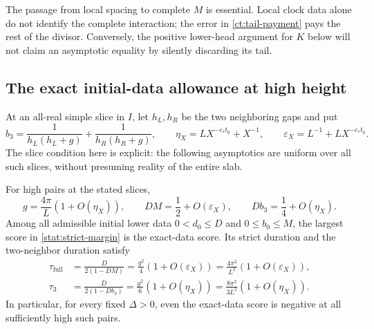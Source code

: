 The passage from local spacing to complete $M$ is essential. Local
clock data alone do not identify the complete interaction; the error
in \eqref{ct:tail-payment} pays the rest of the divisor. Conversely,
the positive lower-head argument for $K$ below will not claim an
asymptotic equality by silently discarding its tail.

\subsection{The exact initial-data allowance at high height}

At an all-real simple slice in $I$, let $h_L,h_R$ be the two neighboring
gaps and put
\[
 b_3=\frac1{h_L(h_L+g)}+\frac1{h_R(h_R+g)},\qquad
 \eta_X=LX^{-c_*t_0}+X^{-1},\qquad
 \varepsilon_X=L^{-1}+LX^{-c_*t_0}.
\]
The slice condition here is explicit: the following asymptotics are
uniform over all such slices, without presuming reality of the entire
slab.

\begin{theorem}
\label{ct:initial-horizon}
For high pairs at the stated slices,
\begin{equation}
 g=\frac{4\pi}{L}(1+O(\eta_X)),\qquad
 DM=\frac12+O(\varepsilon_X),\qquad
 Db_3=\frac14+O(\eta_X).
 \label{ct:initial-asymptotics}
\end{equation}
Among all admissible initial lower data
$0<d_0\le D$ and $0\le b_0\le M$, the largest score in
\eqref{stat:strict-margin} is the exact-data score. Its strict duration
and the two-neighbor duration satisfy
\begin{equation}
 \begin{split}
 \tau_{\mathrm{full}}
 &=\frac{D}{2(1-DM)}
   =\frac{g^2}{4}(1+O(\varepsilon_X))
   =\frac{4\pi^2}{L^2}(1+O(\varepsilon_X)),\\
 \tau_3
 &=\frac{D}{2(1-Db_3)}
   =\frac{g^2}{6}(1+O(\eta_X))
   =\frac{8\pi^2}{3L^2}(1+O(\eta_X)).
 \end{split}
 \label{ct:horizons}
\end{equation}
In particular, for every fixed $\Delta>0$, even the exact-data score
is negative at all sufficiently high such pairs.
\end{theorem}

